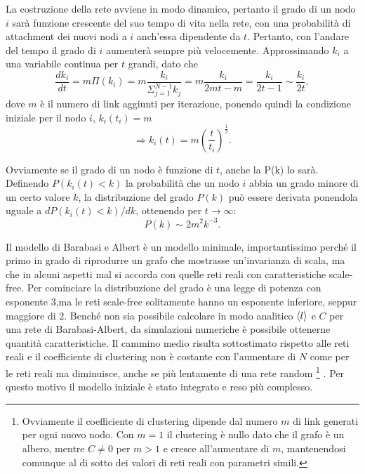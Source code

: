 La costruzione della rete avviene in modo dinamico, pertanto il grado di un nodo $i$ sarà funzione crescente del suo tempo di vita nella rete, con una probabilità di attachment dei nuovi nodi a $i$ anch'essa dipendente da $t$. Pertanto, con l'andare del tempo il grado di $i$ aumenterà sempre più velocemente. Approssimando $k_i$ a una variabile continua per $t$ grandi, dato che 
\[\frac{dk_i}{dt} = m \Pi (k_i) = m \frac{k_i}{\Sigma_{j=1}^{N-1} k_j} = m \frac{k_i}{2mt - m} = \frac{k_i}{2t - 1} \sim \frac{k_i}{2t},\]
dove $m$ è il numero di link aggiunti per iterazione, ponendo quindi la condizione iniziale per il nodo $i$, $k_i(t_i) = m$
\[ \Rightarrow k_i(t) = m (\frac{t}{t_i})^\frac{1}{2}. \]

Ovviamente se il grado di un nodo è funzione di $t$, anche la P(k) lo sarà. Definendo $P(k_i(t)<k)$ la probabilità che un nodo $i$ abbia un grado minore di un certo valore $k$, la distribuzione del grado $P(k)$ può essere derivata ponendola uguale a $dP(k_i(t)<k)/dk$, ottenendo per $t\rightarrow \infty$:
\[ P(k)\sim 2m^2 k^{-3}. \]


Il modello di Barabasi e Albert è un modello minimale, importantissimo perché il primo in grado di riprodurre un grafo che mostrasse un'invarianza di scala, ma che in alcuni aspetti mal si accorda con quelle reti reali con caratteristiche scale-free. Per cominciare la distribuzione del grado è una legge di potenza con esponente $3$,ma le reti scale-free solitamente hanno un esponente inferiore, seppur maggiore di $2$. Benché non sia possibile calcolare in modo analitico $\braket{l}$ e $C$ per una rete di Barabasi-Albert, da simulazioni numeriche è possibile ottenerne quantità caratteristiche. Il cammino medio risulta sottostimato rispetto alle reti reali e il coefficiente di clustering non è costante con l'aumentare di $N$ come per le reti reali ma diminuisce, anche se più lentamente di una rete random \footnote{Ovviamente il coefficiente di clustering dipende dal numero $m$ di link generati per ogni nuovo nodo. Con $m = 1$ il clustering \`e nullo dato che il grafo \`e un albero, mentre $C \neq 0$ per $m>1$ e cresce all'aumentare di $m$, mantenendosi comunque al di sotto dei valori di reti reali con parametri simili.} \parencite{Barbalbert2002}. Per questo motivo il modello iniziale è stato integrato e reso più complesso.  

